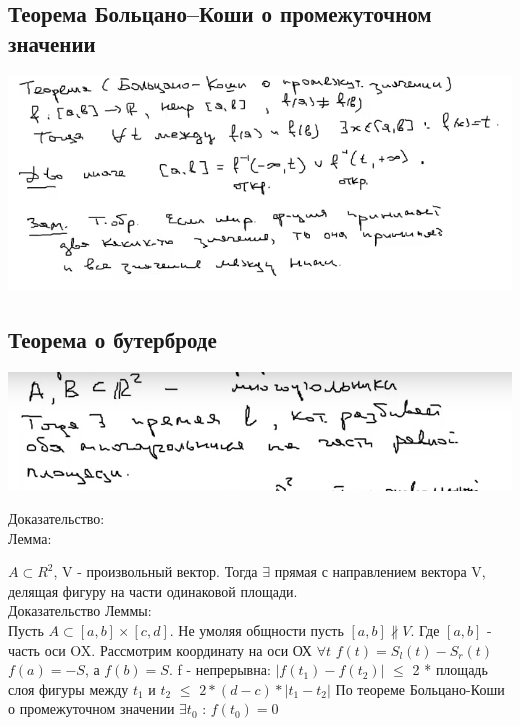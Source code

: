 \newpage
{}
\subsection{Теорема Больцано--Коши о промежуточном значении}

\includegraphics[scale=1.0]{Images/Больцано - Коши.png}





\newpage
\subsection{Теорема о бутерброде}
\includegraphics[scale=0.7]{Images/Бутерброд.png}


Доказательство:\\

Лемма: 

$A \subset R^2$, V - произвольный вектор. Тогда $\exists$ прямая с направлением вектора V, делящая фигуру на части одинаковой площади.\\

Доказательство Леммы: \\

Пусть $A \subset [a,b]\times[c,d]$. Не умоляя общности пусть $[a,b] \not \parallel V$. Где $[a,b]$ - часть оси OX.
Рассмотрим координату на оси ОХ 
$\forall t$ $f(t) = S_l (t) - S_r (t)$ 
$f(a) = -S$, а $f(b) = S$.
f - непрерывна: $|f(t_1) - f(t_2)|$ $\leq$ 2 * площадь слоя фигуры между $t_1$ и $t_2$ $\leq$ $2*(d - c)*|t_1 - t_2|$
По теореме Больцано-Коши о промежуточном значении $\exists t_0$ : $f(t_0) = 0$\\


